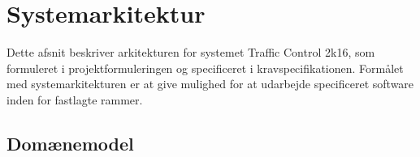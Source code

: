 
\chapter{Systemarkitektur}
\label{sec:arkitektur}

Dette afsnit beskriver arkitekturen for systemet Traffic Control 2k16, som formuleret i projektformuleringen og specificeret i kravspecifikationen. Formålet med systemarkitekturen er at give mulighed for at udarbejde specificeret software inden for fastlagte rammer. 

\section{Domænemodel}